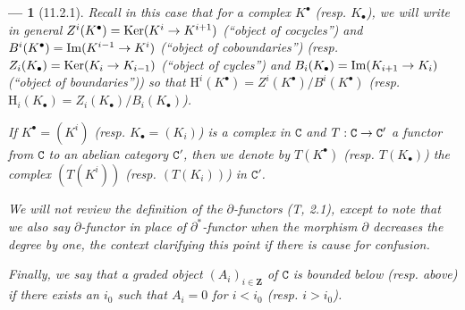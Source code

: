 \documentclass[oneside]{amsart}
\theoremstyle{ega-env-style}
\newtheorem*{env}{---}
\theoremstyle{ega-thm-env-style}
\theoremstyle{ega-defn-env-style}
\def\bb{\mathbf}                    %
\def\cat{\mathtt}                   %
\def\HH{\mathrm{H}}                 %
\def\Ker{\operatorname{Ker}}
\def\Im{\operatorname{Im}}
\renewcommand{\to}{\mathchoice{\longrightarrow}{\rightarrow}{\rightarrow}{\rightarrow}}
\begin{document}
\begin{env}[11.2.1]
Recall in this case that for a complex $K^\bullet$ (resp. $K_\bullet$), we will write in general $Z^i(K^\bullet)=\Ker(K^i\to K^{i+1})$ (``object of cocycles'') and $B^i(K^\bullet)=\Im(K^{i-1}\to K^i)$ (``object of coboundaries'') (resp. $Z_i(K_\bullet)=\Ker(K_i\to K_{i-1})$ (``object of cycles'') and $B_i(K_\bullet)=\Im(K_{i+1}\to K_i)$ (``object of boundaries'')) so that $\HH^i(K^\bullet)=Z^i(K^\bullet)/B^i(K^\bullet)$ (resp. $\HH_i(K_\bullet)=Z_i(K_\bullet)/B_i(K_\bullet)$).

If $K^\bullet=(K^i)$ (resp. $K_\bullet=(K_i)$) is a complex in $\cat{C}$ and $T:\cat{C}\to\cat{C}'$ a functor from $\cat{C}$ to an abelian category $\cat{C}'$, then we denote by $T(K^\bullet)$ (resp. $T(K_\bullet)$) the complex $(T(K^i))$ (resp. $(T(K_i))$) in $\cat{C}'$.

We will not review the definition of the \emph{$\partial$-functors} (T, 2.1), except to note that we \emph{also} say $\partial$-functor in place of $\partial^*$-functor when the morphism $\partial$ decreases the degree by one, the context clarifying this point if there is cause for confusion.

Finally, we say that a \emph{graded object $(A_i)_{i\in\bb{Z}}$} of $\cat{C}$ is \emph{bounded below} (resp. \emph{above}) if there exists an $i_0$ such that $A_i=0$ for $i<i_0$ (resp. $i>i_0$).
\end{env}
\end{document}
